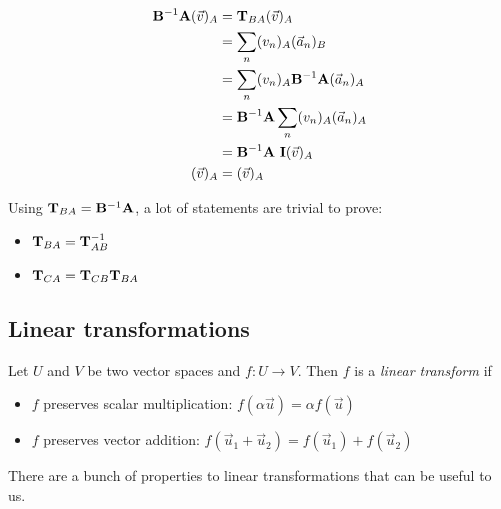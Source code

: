 \begin{equation}
\begin{aligned}
\mathbf{B}^{-1} \mathbf{A} (\vec{v})_A &= \mathbf{T}_{BA}  (\vec{v})_A \\
                                   &= \sum_n (v_n)_A (\vec{a}_n)_B \\
                                   &= \sum_n (v_n)_A \mathbf{B}^{-1} \mathbf{A} (\vec{a}_n)_A \\
                                   &= \mathbf{B}^{-1} \mathbf{A} \sum_n (v_n)_A (\vec{a}_n)_A \\
                                   &= \mathbf{B}^{-1} \mathbf{A} \text{  } \mathbf{I} (\vec{v})_A \\
                    (\vec{v})_A &=  (\vec{v})_A         
\end{aligned}
\end{equation}

Using $\mathbf{T}_{BA} = \mathbf{B}^{-1}\mathbf{A}$, a lot of statements are trivial to prove:
\begin{itemize}
    \item $\mathbf{T}_{BA} = \mathbf{T}_{AB}^{-1}$
    \item $\mathbf{T}_{CA} = \mathbf{T}_{CB} \mathbf{T}_{BA}$
\end{itemize}













\subsection{Linear transformations}

\begin{definition}
Let $U$ and $V$ be two vector spaces and $f:U \to V$. Then $f$ is a \emph{linear transform} if
\begin{itemize}
    \item $f$ preserves scalar multiplication: $f(\alpha \vec{u}) = \alpha f(\vec{u})$
    \item $f$ preserves vector addition: $f(\vec{u}_1 + \vec{u}_2) = f(\vec{u}_1) + f(\vec{u}_2)$
\end{itemize}
\end{definition}

There are a bunch of properties to linear transformations that can be useful to us. 

